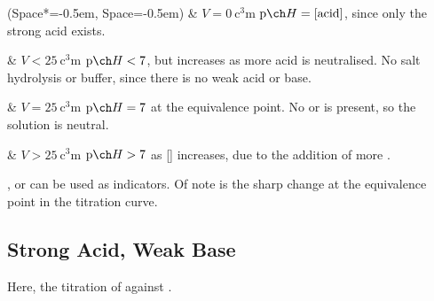 			\begin{bulletlist}
				\ListProperties(Space*=-0.5em, Space=-0.5em)
				& $V = \SI{0}{\cubic\centi\metre}$
					\tabto{25mm}$\MpH = [\mathrm{acid}]$, since only the strong acid exists.

				& $V < \SI{25}{\cubic\centi\metre}$
					\tabto{25mm}$\MpH < 7$, but increases as more acid is neutralised.
					\tabto{25mm}No salt hydrolysis or buffer, since there is no weak acid or base.

				& $V = \SI{25}{\cubic\centi\metre}$
					\tabto{25mm}$\MpH = 7$ at the equivalence point.
					\tabto{25mm}No  or  is present, so the solution is neutral.

				& $V > \SI{25}{\cubic\centi\metre}$
					\tabto{25mm}$\MpH > 7$ as [] increases, due to the addition of more .

			\end{bulletlist}

			,  or  can be used as indicators. Of note is the sharp \pH{}
			change at the equivalence point in the titration curve.

















		\pagebreak
		\subsection{Strong Acid, Weak Base}

			Here, the titration of  against .

